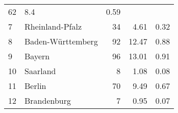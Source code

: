 \begin{longtable}{lXrrr}
       \num{62} &
       \num[round-mode=places,round-precision=2]{8,4} &
         \num[round-mode=places,round-precision=2]{0,59} \\

     7 &
     \multicolumn{1}{X}{ Rheinland-Pfalz   } &


       \num{34} &
       \num[round-mode=places,round-precision=2]{4,61} &
         \num[round-mode=places,round-precision=2]{0,32} \\

     8 &
     \multicolumn{1}{X}{ Baden-Württemberg   } &


       \num{92} &
       \num[round-mode=places,round-precision=2]{12,47} &
         \num[round-mode=places,round-precision=2]{0,88} \\

     9 &
     \multicolumn{1}{X}{ Bayern   } &


       \num{96} &
       \num[round-mode=places,round-precision=2]{13,01} &
         \num[round-mode=places,round-precision=2]{0,91} \\

     10 &
     \multicolumn{1}{X}{ Saarland   } &


       \num{8} &
       \num[round-mode=places,round-precision=2]{1,08} &
         \num[round-mode=places,round-precision=2]{0,08} \\

     11 &
     \multicolumn{1}{X}{ Berlin   } &


       \num{70} &
       \num[round-mode=places,round-precision=2]{9,49} &
         \num[round-mode=places,round-precision=2]{0,67} \\

     12 &
     \multicolumn{1}{X}{ Brandenburg   } &


       \num{7} &
       \num[round-mode=places,round-precision=2]{0,95} &
         \num[round-mode=places,round-precision=2]{0,07} \\


\end{longtable}
